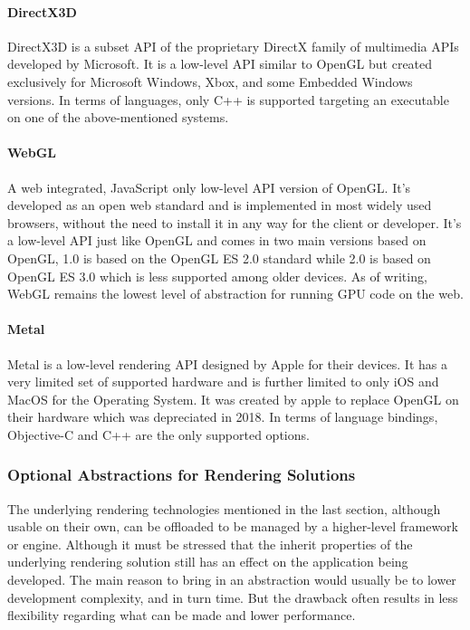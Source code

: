 \paragraph{DirectX3D}
DirectX3D is a subset API of the proprietary DirectX family of multimedia APIs developed by Microsoft. It is a low-level API similar to OpenGL but created exclusively for Microsoft Windows, Xbox, and some Embedded Windows versions. In terms of languages, only C++ is supported targeting an executable on one of the above-mentioned systems.

\paragraph{WebGL}
A web integrated, JavaScript only low-level API version of OpenGL. It’s developed as an open web standard and is implemented in most widely used browsers, without the need to install it in any way for the client or developer. It’s a low-level API just like OpenGL and comes in two main versions based on OpenGL, 1.0 is based on the OpenGL ES 2.0 standard while 2.0 is based on OpenGL ES 3.0 which is less supported among older devices. As of writing, WebGL remains the lowest level of abstraction for running GPU code on the web.

\paragraph{Metal}
Metal is a low-level rendering API designed by Apple for their devices. It has a very limited set of supported hardware and is further limited to only iOS and MacOS for the Operating System. It was created by apple to replace OpenGL on their hardware which was depreciated in 2018. In terms of language bindings, Objective-C and C++ are the only supported options.

\subsubsection{Optional Abstractions for Rendering Solutions}
The underlying rendering technologies mentioned in the last section, although usable on their own, can be offloaded to be managed by a higher-level framework or engine. Although it must be stressed that the inherit properties of the underlying rendering solution still has an effect on the application being developed.
The main reason to bring in an abstraction would usually be to lower development complexity, and in turn time. But the drawback often results in less flexibility regarding what can be made and lower performance.

